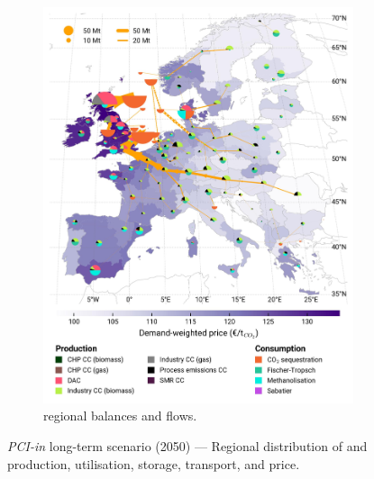 \documentclass[final,5p,times,twocolumn,sort&compress]{elsarticle}
\begin{document}
\begin{figure}[htbp]
\begin{subfigure}[t]{0.49\textwidth}
      \includegraphics[width=1\textwidth]{maps/pcipmi-national-international-expansion/base_s_adm___2050-balance_map_co2_stored} 
      \vspace{-0.7cm}
      \caption{ regional balances and flows.}
      \label{fig:PCI-in_lt_2050_co2}
  \end{subfigure}
  \caption{\textit{PCI-in} long-term scenario (2050) --- Regional distribution of  and  production, utilisation, storage, transport, and price.}
  \label{fig:PCI-in_lt_2050}
\end{figure}
\end{document}
